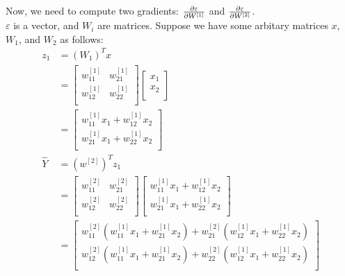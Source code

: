 Now, we need to compute two gradients: $\frac{\partial \varepsilon}{\partial W^{[1]}}$ and $\frac{\partial \varepsilon}{\partial W^{[2]}}$.\\
$\varepsilon$ is a vector, and $W_i$ are matrices.
Suppose we have some arbitary matrices $x$, $W_1$, and $W_2$ as follows:
\begin{align*}
    z_1 & = (W_1)^T x \\
    & = \left[ \begin{matrix}
        w^{[1]}_{11} & w^{[1]}_{21} \\
        w^{[1]}_{12} & w^{[1]}_{22} \\
    \end{matrix} \right] \left[
        \begin{matrix}
            x_1 \\
            x_2 \\
        \end{matrix}
    \right] \\
    & = \left[
        \begin{matrix}
            w^{[1]}_{11} x_1 + w^{[1]}_{12} x_2 \\
            w^{[1]}_{21} x_1 + w^{[1]}_{22} x_2 \\
        \end{matrix}
    \right] \\
    \hat{Y} & = (w^{[2]})^T z_1 \\
    & = \left[ \begin{matrix}
        w^{[2]}_{11} & w^{[2]}_{21} \\
        w^{[2]}_{12} & w^{[2]}_{22} \\
    \end{matrix} \right] \left[
        \begin{matrix}
            w^{[1]}_{11} x_1 + w^{[1]}_{12} x_2 \\
            w^{[1]}_{21} x_1 + w^{[1]}_{22} x_2 \\
        \end{matrix}
    \right] \\
    & = \left[
        \begin{matrix}
            w^{[2]}_{11} (w^{[1]}_{11} x_1 + w^{[1]}_{21} x_2) + w^{[2]}_{21} (w^{[1]}_{12} x_1 + w^{[1]}_{22} x_2) \\
            w^{[2]}_{12} (w^{[1]}_{11} x_1 + w^{[1]}_{21} x_2) + w^{[2]}_{22} (w^{[1]}_{12} x_1 + w^{[1]}_{22} x_2) \\
        \end{matrix}
    \right]
\end{align*}
